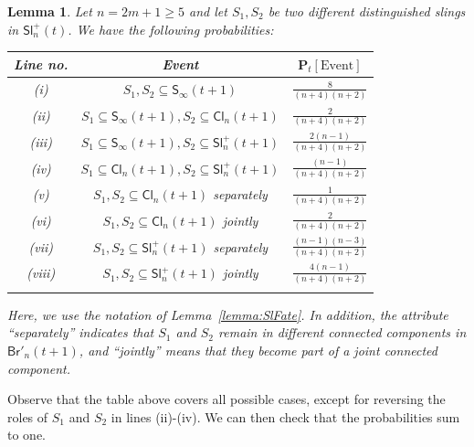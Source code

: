 \documentclass[a4paper,11pt,reqno]{amsart}
\newcommand{\paul}[1]{\todo[color=yellow!70,inline]{Paul: #1}}
\newcommand{\bP}{\mathbf{P}}
\newcommand{\Br}{\mathsf{Br}}
\newcommand{\Slr}{\mathsf{Sl}^+}
\newcommand{\Soo}{\mathsf{S}_\infty}
\newcommand{\Cl}{\mathsf{Cl}}
\newcommand{\ssq}{\subseteq}
\newtheorem{lemma}{Lemma}
\theoremstyle{definition}
\begin{document}
\begin{lemma}\label{lemma:Slfate2}
 Let $n=2m+1\geq 5$ and let $S_1,S_2$ be two different distinguished slings in $\Slr_n(t)$. 
 We have the following probabilities:
 \begin{center}
 \begin{tabular}{ccc}
  \toprule
  Line no. & Event & $\bP_t[\text{Event}]$ \\ \midrule \addlinespace
  (i) & $S_1,S_2 \ssq \Soo(t+1)$ & $\frac{8}{(n+4)(n+2)}$ \\ \addlinespace
  (ii) & $S_1 \ssq \Soo(t+1), S_2\ssq \Cl_n(t+1)$ & $\frac{2}{(n+4)(n+2)}$ \\ \addlinespace
  (iii) & $S_1 \ssq \Soo(t+1), S_2\ssq \Slr_n(t+1)$ & $\frac{2(n-1)}{(n+4)(n+2)}$ \\ \addlinespace
  (iv) & $S_1 \ssq \Cl_n(t+1), S_2\ssq \Slr_n(t+1)$ & $\frac{(n-1)}{(n+4)(n+2)}$ \\ \addlinespace
  (v) & $S_1,S_2 \ssq \Cl_n(t+1)$ separately  & $\frac{1}{(n+4)(n+2)}$ \\ \addlinespace
  (vi) & $S_1,S_2 \ssq \Cl_n(t+1)$ jointly  & $\frac{2}{(n+4)(n+2)}$ \\ \addlinespace 
  (vii) & $S_1,S_2 \ssq \Slr_n(t+1)$ separately & $\frac{(n-1)(n-3)}{(n+4)(n+2)}$ \\ \addlinespace
  (viii) & $S_1,S_2 \ssq \Slr_n(t+1)$ jointly & $\frac{4(n-1)}{(n+4)(n+2)}$ \\ \addlinespace  \bottomrule
 \end{tabular}
 \end{center}
 Here, we use the notation of Lemma~\ref{lemma:SlFate}. In addition, the attribute ``separately'' indicates that $S_1$ and $S_2$ remain in different connected components in $\Br'_n(t+1)$, and ``jointly'' means that they become part of a joint connected component. 
\end{lemma}
Observe that the table above covers all possible cases, except for reversing the roles of $S_1$ and $S_2$ in lines (ii)-(iv). We can then check that the probabilities sum to one. 
\end{document}
